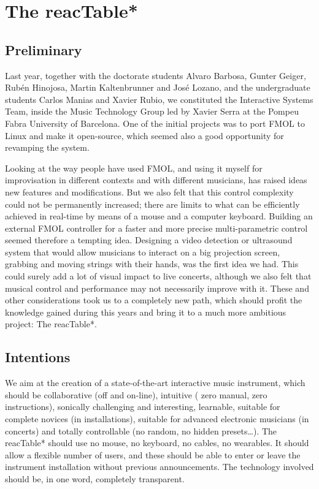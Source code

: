 \section{The reacTable*}

\subsection{Preliminary}

Last year, together with the doctorate students  Alvaro Barbosa,    Gunter   
Geiger,    Rub\'{e}n    Hinojosa,    Martin Kaltenbrunner and Jos\'{e} Lozano,
and the  undergraduate students Carlos Manias and Xavier Rubio, we constituted
the Interactive Systems Team, inside the Music Technology Group led by Xavier
Serra at the Pompeu Fabra University of Barcelona. One of the initial projects
was to port FMOL  to Linux and make it open-source, which seemed also a good
opportunity for revamping the system.

Looking at the way people have used  FMOL, and  using  it myself for
improvisation in different contexts and with different musicians, has raised
ideas new features and modifications. But we also felt that  this  control 
complexity could not be permanently increased; there  are limits  to  what can be
efficiently achieved in real-time by means of  a mouse and a computer keyboard.
Building an external FMOL controller for a faster and more precise
multi-parametric control seemed therefore a tempting idea. Designing  a video
detection or ultrasound system that would  allow musicians  to  interact on a big
projection  screen, grabbing  and moving  strings  with their hands, was the
first idea we had. This could surely add a lot of visual impact to live concerts,
although we also felt that musical control and performance may not necessarily
improve with it. These and other considerations took us to a completely new path,
which should profit  the  knowledge  gained  during this years and bring it to a
much more ambitious  project: The reacTable*.

\subsection{Intentions}

We aim at the creation of a state-of-the-art interactive music instrument, which
should be collaborative (off and on-line), intuitive   ( zero manual,   zero instructions),   sonically challenging and interesting, learnable, suitable for
complete novices (in installations), suitable for advanced electronic musicians
(in concerts) and  totally  controllable  (no  random, no hidden presets\ldots{}). The reacTable*  should  use  no  mouse, no keyboard,  no  cables,  no  wearables.  It  should   allow  a flexible number of users, and these should  be able to enter or leave the  instrument installation   without previous announcements. The technology involved should be, in one word, completely transparent.

